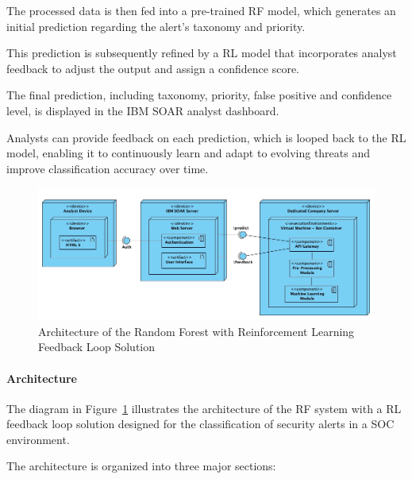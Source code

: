 The processed data is then fed into a pre-trained \gls{RF} model, which generates an initial prediction regarding the alert's taxonomy and priority. 

This prediction is subsequently refined by a \gls{RL} model that incorporates analyst feedback to adjust the output and assign a confidence score. 

The final prediction, including taxonomy, priority, false positive and confidence level, is displayed in the IBM SOAR analyst dashboard. 

Analysts can provide feedback on each prediction, which is looped back to the \gls{RL} model, enabling it to continuously learn and adapt to evolving threats and improve classification accuracy over time.

\begin{figure}[h!]
    \centering
    \includegraphics[width=\textwidth]{ch3/assets/Soltution1_Archquiteture.png}
    \caption{Architecture of the Random Forest with Reinforcement Learning Feedback Loop Solution}
    \label{fig:solution1_architecture}
\end{figure}

\paragraph{Architecture}

The diagram in Figure~\ref{fig:solution1_architecture} illustrates the architecture of the \gls{RF} system with a \gls{RL} feedback loop solution designed for the classification of security alerts in a SOC environment.

The architecture is organized into three major sections:

